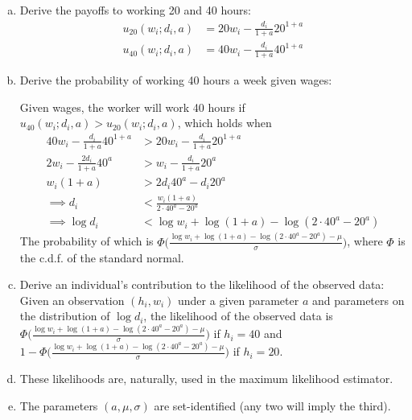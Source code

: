 \documentclass[11pt]{article}
\begin{document}
\begin{enumerate}[a)]

	\item Derive the payoffs to working 20 and 40 hours:
	\begin{align*}
		u_{20}(w_i;d_i,a) &= 20 w_i - \frac{d_i}{1+a} 20^{1+a} \\
		u_{40}(w_i;d_i,a) &= 40 w_i - \frac{d_i}{1+a} 40^{1+a}
	\end{align*}

	\item Derive the probability of working 40 hours a week given wages:

	Given wages, the worker will work 40 hours if $u_{40}(w_i;d_i,a) > u_{20}(w_i;d_i,a)$, which holds when
	\begin{align*}
		40 w_i - \frac{d_i}{1+a} 40^{1+a} &> 20 w_i - \frac{d_i}{1+a} 20^{1+a} \\
		2 w_i - \frac{2d_i}{1+a} 40^{a} &> w_i - \frac{d_i}{1+a} 20^{a} \\
		w_i (1+a) &> 2d_i 40^a- d_i 20^{a} \\
		\implies d_i &< \frac{w_i (1+a)}{2 \cdot 40^a - 20^a} \\
		\implies \log d_i &< \log w_i + \log (1+a) - \log(2 \cdot 40^a - 20^a)
	\end{align*}
	The probability of which is $\Phi \bigg( \frac{\log w_i + \log (1+a) - \log(2 \cdot 40^a - 20^a) - \mu}{\sigma} \bigg)$, where $\Phi$ is the c.d.f. of the standard normal.

	\item Derive an individual's contribution to the likelihood of the observed data: Given an observation $(h_i, w_i)$ under a given parameter $a$ and parameters on the distribution of $\log d_i$, the likelihood of the observed data is $\Phi \bigg( \frac{\log w_i + \log (1+a) - \log(2 \cdot 40^a - 20^a) - \mu}{\sigma} \bigg)$ if $h_i = 40$ and $1 - \Phi \bigg( \frac{\log w_i + \log (1+a) - \log(2 \cdot 40^a - 20^a) - \mu}{\sigma} \bigg)$ if $h_i = 20$.

	\item These likelihoods are, naturally, used in the maximum likelihood estimator.

	\item The parameters $(a, \mu, \sigma)$ are set-identified (any two will imply the third).


\end{enumerate}
\end{document}
